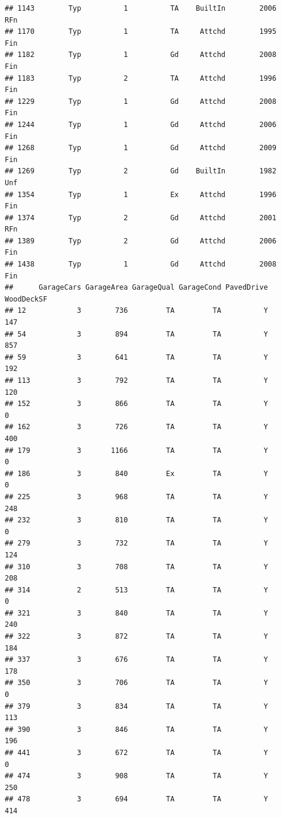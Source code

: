 \documentclass[]{article}
\begin{document}
\begin{verbatim}
## 1143        Typ          1          TA    BuiltIn        2006          RFn
## 1170        Typ          1          TA     Attchd        1995          Fin
## 1182        Typ          1          Gd     Attchd        2008          Fin
## 1183        Typ          2          TA     Attchd        1996          Fin
## 1229        Typ          1          Gd     Attchd        2008          Fin
## 1244        Typ          1          Gd     Attchd        2006          Fin
## 1268        Typ          1          Gd     Attchd        2009          Fin
## 1269        Typ          2          Gd    BuiltIn        1982          Unf
## 1354        Typ          1          Ex     Attchd        1996          Fin
## 1374        Typ          2          Gd     Attchd        2001          RFn
## 1389        Typ          2          Gd     Attchd        2006          Fin
## 1438        Typ          1          Gd     Attchd        2008          Fin
##      GarageCars GarageArea GarageQual GarageCond PavedDrive WoodDeckSF
## 12            3        736         TA         TA          Y        147
## 54            3        894         TA         TA          Y        857
## 59            3        641         TA         TA          Y        192
## 113           3        792         TA         TA          Y        120
## 152           3        866         TA         TA          Y          0
## 162           3        726         TA         TA          Y        400
## 179           3       1166         TA         TA          Y          0
## 186           3        840         Ex         TA          Y          0
## 225           3        968         TA         TA          Y        248
## 232           3        810         TA         TA          Y          0
## 279           3        732         TA         TA          Y        124
## 310           3        708         TA         TA          Y        208
## 314           2        513         TA         TA          Y          0
## 321           3        840         TA         TA          Y        240
## 322           3        872         TA         TA          Y        184
## 337           3        676         TA         TA          Y        178
## 350           3        706         TA         TA          Y          0
## 379           3        834         TA         TA          Y        113
## 390           3        846         TA         TA          Y        196
## 441           3        672         TA         TA          Y          0
## 474           3        908         TA         TA          Y        250
## 478           3        694         TA         TA          Y        414

\end{verbatim}
\end{document}
